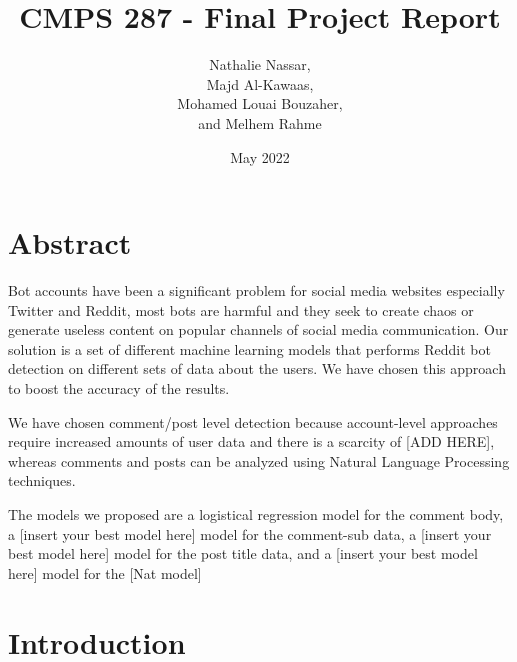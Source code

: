 \documentclass{article}
\title{CMPS 287 - Final Project Report}
\author{Nathalie Nassar, \\Majd Al-Kawaas,\\ Mohamed Louai Bouzaher,\\ and Melhem Rahme}
\date{May 2022}
\begin{document}
\maketitle

\section{Abstract}
Bot accounts have been a significant problem for social media websites especially Twitter and Reddit, most bots are harmful and they seek to create chaos or generate useless content on popular channels of social media communication. Our solution is a set of different machine learning models that performs Reddit bot detection on different sets of data about the users. We have chosen this approach to boost the accuracy of the results. \par

We have chosen comment/post level detection because account-level approaches require increased amounts of user data and there is a scarcity of [ADD HERE], whereas comments and posts can be analyzed using Natural Language Processing techniques.\par

The models we proposed are a logistical regression model for the comment body, a [insert your best model here] model for the comment-sub data, a [insert your best model here] model for the post title data, and a [insert your best model here] model for the [Nat model] \par

\section{Introduction}
\end{document}

